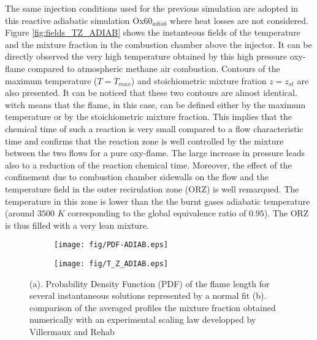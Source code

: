 \documentclass[twocolumn,10pt]{asme2e}
\begin{document}
The same injection conditions used for the previous simulation are adopted in this reactive adiabatic simulation Ox60$_{adiab}$ where heat losses are not considered. Figure \ref{fig:fields_TZ_ADIAB} shows the instanteous fields of the temperature and the mixture fraction in the combustion chamber above the injector. It can be directly observed the very high temperature obtained by this high pressure oxy-flame compared to atmospheric methane air combustion. Contours of the maximum temperature ($T=T_{max}$) and stoichiometric mixture fration $z=z_{st}$ are also presented. It can be noticed that these two contours are almost identical. witch means that the flame, in this case, can be defined either by the maximum temperature or by the stoichiometric mixture fraction. This implies that the chemical time of such a reaction is very small compared to a flow characteristic time and confirms that the reaction zone is well controlled by the mixture between the two flows for a pure oxy-flame. The large increase in pressure leads also to a reduction of the reaction chemical time. Moreover, the effect of the confinement due to combustion chamber sidewalls on the flow and the temperature field in the outer recirulation zone (ORZ) is well remarqued. The temperature in this zone is lower than the the burnt gases adiabatic temperature (around $3500$ $K$ corresponding to the global equivalence ratio of $0.95$). The ORZ is thus filled with a very lean mixture.  \\

\begin{figure}
   \begin{subfigure}[b]{1\linewidth}        %
       \centering
       \texttt{[image: fig/PDF-ADIAB.eps]}
       \caption{ }
   \end{subfigure}
      \begin{subfigure}[b]{1\linewidth}        %
       \centering
       \texttt{[image: fig/T\_Z\_ADIAB.eps]}
       \caption{ }
   \end{subfigure}
      \caption{ (a). Probability Density Function (PDF) of the flame length for several instantaneous solutions represented by a normal fit   (b). comparison of the averaged profiles the mixture fraction obtained numerically with an experimental scaling law developped by Villermaux and Rehab \cite{villermaux2000mixing} }
   \label{fig:profiles_TZ_ADIAB}
   \vspace{-0.05 cm}
\end{figure}
\end{document}
